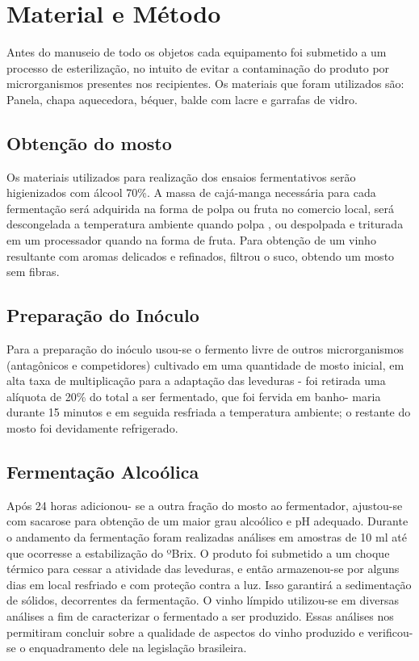\documentclass[article,12pt,onesidea,4paper,english,brazil]{abntex2}
\begin{document}
	\section*{Material e Método}
	
	Antes do manuseio de todo os objetos cada equipamento foi submetido a um processo de esterilização, no intuito de evitar a contaminação do produto por microrganismos presentes nos recipientes. Os materiais que foram utilizados são: Panela, chapa aquecedora, béquer, balde com lacre e garrafas de vidro.
	
	\subsection*{Obtenção do mosto}
	
	Os materiais utilizados para realização dos ensaios fermentativos serão higienizados com álcool 70\%. A massa de cajá-manga necessária para cada fermentação será adquirida na forma de polpa ou fruta no comercio local, será descongelada a temperatura ambiente quando polpa , ou despolpada e triturada em um processador quando na forma de fruta. Para obtenção de um vinho resultante com aromas delicados e refinados, filtrou o suco, obtendo um mosto sem fibras.
	
\subsection*{Preparação do Inóculo}
	
	Para a preparação do inóculo usou-se o fermento livre de outros microrganismos (antagônicos e competidores) cultivado em uma quantidade de mosto inicial, em alta taxa de multiplicação para a adaptação das leveduras - foi retirada uma alíquota de 20\% do total a ser fermentado, que foi fervida em banho- maria durante 15 minutos e em seguida resfriada a temperatura ambiente; o restante do mosto foi devidamente refrigerado.
	
	\subsection*{Fermentação Alcoólica}
	
	Após 24 horas adicionou- se a outra fração do mosto ao fermentador, ajustou-se com sacarose para obtenção de um maior grau alcoólico e pH adequado. Durante o andamento da fermentação foram realizadas análises em amostras de 10 ml até que ocorresse a estabilização do ºBrix. O produto foi submetido a um choque térmico para cessar a atividade das leveduras, e então armazenou-se por alguns dias em local resfriado e com proteção contra a luz. Isso garantirá a sedimentação de sólidos, decorrentes da fermentação. O vinho límpido utilizou-se em diversas análises a fim de caracterizar o fermentado a ser produzido. Essas
	análises nos permitiram concluir sobre a qualidade de aspectos do vinho produzido e verificou-se o enquadramento dele na legislação brasileira.
	
\end{document}
